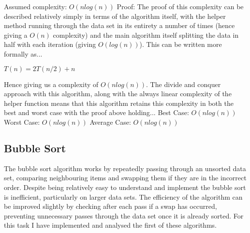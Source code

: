 \documentclass{article}
\begin{document}
Assumed complexity: \begin{math}O(nlog(n)) \end{math}
\newline\newline\newline
Proof:
\newline
The proof of this complexity can be described relatively simply in terms of the algorithm itself, with the helper method running through the data set in its entirety a number of times (hence giving a \begin{math}O(n)\end{math} complexity) and the main algorithm itself splitting the data in half with each iteration (giving \begin{math}O(log(n)) \end{math}). This can be written more formally as...
\newline\newline
\centerline{
\begin{math}
T(n) = 2T(n/2) + n
\end{math}
}
\newline\newline
Hence giving us a complexity of \begin{math}O(nlog(n)) \end{math}.
\newline
The divide and conquer approach with this algorithm, along with the always linear complexity of the helper function means that this algorithm retains this complexity in both the best and worst case with the proof above holding...
\newline\newline
Best Case: \begin{math}O(nlog(n))\end{math}
\newline\newline
Worst Case: \begin{math}O(nlog(n))\end{math}
\newline\newline
Average Case: \begin{math}O(nlog(n))\end{math}
\newline




\subsection{Bubble Sort}
The bubble sort algorithm works by repeatedly passing through an unsorted data set, comparing neighbouring items and swapping them if they are in the incorrect order. Despite being relatively easy to understand and implement the bubble sort is inefficient, particularly on larger data sets. The efficiency of the algorithm can be improved slightly by checking after each pass if a swap has occurred, preventing unnecessary passes through the data set once it is already sorted. For this task I have implemented and analysed the first of these algorithms.
\end{document}
